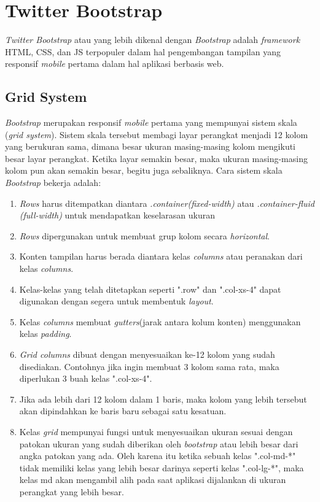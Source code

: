 \section{Twitter Bootstrap}
\label{sec: Bootrstrap}

\textit{Twitter Bootstrap}\cite{bootstrap} atau yang lebih dikenal dengan \textit{Bootstrap} adalah \textit{framework} HTML, CSS, dan JS terpopuler dalam hal pengembangan tampilan yang responsif \textit{mobile} pertama dalam hal aplikasi berbasis web. 

\subsection{Grid System}
\label{sub: gridSystem}

\textit{Bootstrap} merupakan responsif \textit{mobile} pertama yang mempunyai sistem skala (\textit{grid system}). Sistem skala tersebut membagi layar perangkat menjadi 12 kolom yang berukuran sama, dimana besar ukuran masing-masing kolom mengikuti besar layar perangkat. Ketika layar semakin besar, maka ukuran masing-masing kolom pun akan semakin besar, begitu juga sebaliknya. Cara sistem skala \textit{Bootstrap} bekerja adalah:

\begin{enumerate}
	\item \textit{Rows} harus ditempatkan diantara \textit{.container(fixed-width)} atau \textit{.container-fluid (full-width)} untuk mendapatkan keselarasan ukuran
	\item \textit{Rows} dipergunakan untuk membuat grup kolom secara \textit{horizontal}.
	\item Konten tampilan harus berada diantara kelas \textit{columns} atau peranakan dari kelas \textit{columns}.
	\item Kelas-kelas yang telah ditetapkan seperti ".row" dan ".col-xs-4" dapat digunakan dengan segera untuk membentuk \textit{layout}.
	\item Kelas \textit{columns} membuat \textit{gutters}(jarak antara kolum konten) menggunakan kelas \textit{padding}.
	\item \textit{Grid columns} dibuat dengan menyesuaikan ke-12 kolom yang sudah disediakan. Contohnya jika ingin membuat 3 kolom sama rata, maka diperlukan 3 buah kelas ".col-xs-4".
	\item Jika ada lebih dari 12 kolom dalam 1 baris, maka kolom yang lebih tersebut akan dipindahkan ke baris baru sebagai satu kesatuan.
	\item Kelas \textit{grid} mempunyai fungsi untuk menyesuaikan ukuran sesuai dengan patokan ukuran yang sudah diberikan oleh \textit{bootstrap} atau lebih besar dari angka patokan yang ada. Oleh karena itu ketika sebuah kelas ".col-md-*" tidak memiliki kelas yang lebih besar darinya seperti kelas ".col-lg-*", maka kelas md akan mengambil alih pada saat aplikasi dijalankan di ukuran perangkat yang lebih besar. 
\end{enumerate}
	
